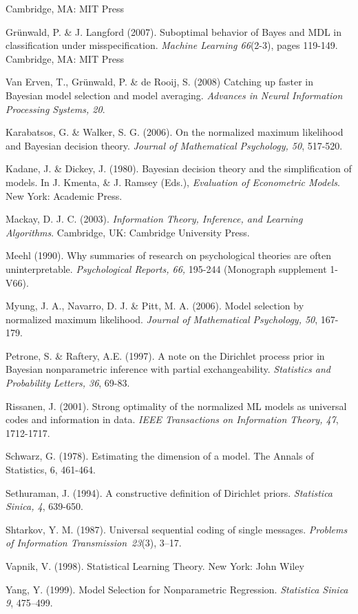 \documentclass[authoryear]{elsarticle}
\begin{document}
\begin{list}{}{\setlength{\leftmargin}{12pt}\setlength{\itemindent}{-12pt}
\setlength{\parsep}{0pt}}
  Cambridge, MA: MIT Press
\item Gr\"{u}nwald, P. \& J. Langford (2007). Suboptimal behavior of
  Bayes and MDL in classification under misspecification. {\it Machine Learning  66\/}(2-3), pages 119-149.
  Cambridge, MA: MIT Press
\item Van Erven, T., Gr\"{u}nwald, P. \&  de Rooij, S. (2008) Catching up faster
in Bayesian model selection and model averaging. {\it Advances in Neural Information Processing Systems, 20}.
\item Karabatsos, G. \& Walker, S. G. (2006). On the normalized
  maximum likelihood and Bayesian decision theory. {\it Journal of
    Mathematical Psychology, 50}, 517-520.
\item Kadane, J. \& Dickey, J. (1980). Bayesian decision theory and
  the simplification of models. In J. Kmenta, \& J. Ramsey (Eds.),
  {\em Evaluation of Econometric Models}. New York: Academic Press.
\item Mackay, D. J. C. (2003). {\it Information Theory, Inference, and Learning
  Algorithms}. Cambridge, UK: Cambridge University Press.
\item Meehl (1990). Why summaries of research on psychological theories are often
  uninterpretable. {\it Psychological Reports, 66,} 195-244 (Monograph supplement
  1-V66).
\item Myung, J. A., Navarro, D. J. \& Pitt, M. A. (2006). Model selection by normalized
maximum likelihood. {\it Journal of Mathematical Psychology, 50}, 167-179.
\item Petrone, S. \& Raftery, A.E. (1997). A note on the Dirichlet
  process prior in Bayesian nonparametric inference with partial
  exchangeability. {\it Statistics and Probability Letters, 36}, 69-83.
\item Rissanen, J. (2001). Strong optimality of the normalized ML models
  as universal codes and information in data. {\it IEEE Transactions on
  Information Theory, 47}, 1712-1717.
\item Schwarz, G. (1978). Estimating the dimension of a model. {The Annals of
  Statistics, 6}, 461-464.
\item Sethuraman, J. (1994). A constructive definition of Dirichlet priors.
  {\it Statistica Sinica, 4}, 639-650.
\item Shtarkov, Y. M. (1987). Universal sequential coding of single messages.
  {\it Problems of Information Transmission}~{\em 23\/}(3), 3--17.
\item Vapnik, V. (1998). Statistical Learning Theory. New York: John Wiley
\item Yang, Y. (1999). Model Selection for Nonparametric
  Regression. {\it Statistica Sinica 9}, 475--499.
\end{list}
\end{document}
